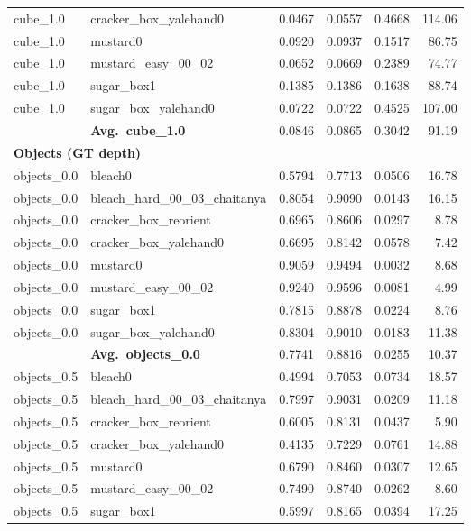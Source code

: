 \begin{longtable}{llrrrr}
  cube_1.0 & cracker\_box\_yalehand0 & 0.0467 & 0.0557 & 0.4668 & 114.06 \\
  cube_1.0 & mustard0 & 0.0920 & 0.0937 & 0.1517 & 86.75 \\
  cube_1.0 & mustard\_easy\_00\_02 & 0.0652 & 0.0669 & 0.2389 & 74.77 \\
  cube_1.0 & sugar\_box1 & 0.1385 & 0.1386 & 0.1638 & 88.74 \\
  cube_1.0 & sugar\_box\_yalehand0 & 0.0722 & 0.0722 & 0.4525 & 107.00 \\
  \cmidrule{2-6}
  & \textbf{Avg.~cube_1.0} & 0.0846 & 0.0865 & 0.3042 & 91.19 \\
  \midrule
\multicolumn{6}{l}{\textbf{Objects (GT depth)}} \\
\midrule
  objects_0.0 & bleach0 & 0.5794 & 0.7713 & 0.0506 & 16.78 \\
  objects_0.0 & bleach\_hard\_00\_03\_chaitanya & 0.8054 & 0.9090 & 0.0143 & 16.15 \\
  objects_0.0 & cracker\_box\_reorient & 0.6965 & 0.8606 & 0.0297 & 8.78 \\
  objects_0.0 & cracker\_box\_yalehand0 & 0.6695 & 0.8142 & 0.0578 & 7.42 \\
  objects_0.0 & mustard0 & 0.9059 & 0.9494 & 0.0032 & 8.68 \\
  objects_0.0 & mustard\_easy\_00\_02 & 0.9240 & 0.9596 & 0.0081 & 4.99 \\
  objects_0.0 & sugar\_box1 & 0.7815 & 0.8878 & 0.0224 & 8.76 \\
  objects_0.0 & sugar\_box\_yalehand0 & 0.8304 & 0.9010 & 0.0183 & 11.38 \\
  \cmidrule{2-6}
  & \textbf{Avg.~objects_0.0} & 0.7741 & 0.8816 & 0.0255 & 10.37 \\
  \midrule
  objects_0.5 & bleach0 & 0.4994 & 0.7053 & 0.0734 & 18.57 \\
  objects_0.5 & bleach\_hard\_00\_03\_chaitanya & 0.7997 & 0.9031 & 0.0209 & 11.18 \\
  objects_0.5 & cracker\_box\_reorient & 0.6005 & 0.8131 & 0.0437 & 5.90 \\
  objects_0.5 & cracker\_box\_yalehand0 & 0.4135 & 0.7229 & 0.0761 & 14.88 \\
  objects_0.5 & mustard0 & 0.6790 & 0.8460 & 0.0307 & 12.65 \\
  objects_0.5 & mustard\_easy\_00\_02 & 0.7490 & 0.8740 & 0.0262 & 8.60 \\
  objects_0.5 & sugar\_box1 & 0.5997 & 0.8165 & 0.0394 & 17.25 \\

\end{longtable}
